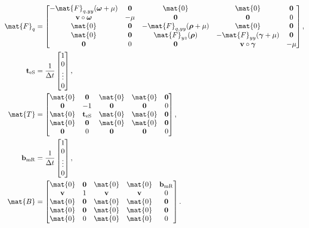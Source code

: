 \documentclass{jpmarticle}
\renewcommand{\vec}[1]{\boldsymbol{\mathrm{#1}}}
\let\subequationsorig\subequations%
\let\endsubequationsorig\endsubequations%
\renewenvironment{subequations}{
  \subequationsorig
  \renewcommand{\theequation}{\theparentequation.\arabic{equation}}
}{
  \endsubequationsorig
}
\begin{document}
\begin{subequations}
\begin{align}
    \mat{F}_q &=
    \begin{bmatrix}
      - \mat{F}_{q, yy}(\vec{\omega} + \mu) & \vec{0} & \mat{0} & \mat{0}
      & \vec{0}
      \\
      \vec{v} \circ \vec{\omega} & - \mu & \vec{0} & \vec{0} & 0
      \\
      \mat{0} & \vec{0} & - \mat{F}_{q, yy}(\vec{\rho} + \mu) & \mat{0}
      & \vec{0}
      \\
      \mat{0} & \vec{0} & \mat{F}_{yz}(\vec{\rho})
      & - \mat{F}_{yy}(\vec{\gamma} + \mu) & \vec{0}
      \\
      \vec{0} & 0 & \vec{0} & \vec{v} \circ \vec{\gamma} & - \mu
    \end{bmatrix},
    \\
    \vec{t}_{\mathrm{eS}} &=
    \frac{1}{\Delta t}
    \begin{bmatrix}
      1 \\ 0 \\ \vdots \\ 0
    \end{bmatrix},
    \\
    \mat{T} &=
    \begin{bmatrix}
      \mat{0} & \vec{0} & \mat{0} & \mat{0} & \vec{0}
      \\
      \vec{0} & - 1 & \vec{0} & \vec{0} & 0
      \\
      \mat{0} & \vec{t}_{\mathrm{eS}} & \mat{0} & \mat{0} & \vec{0}
      \\
      \mat{0} & \vec{0} & \mat{0} & \mat{0} & \vec{0}
      \\
      \vec{0} & 0 & \vec{0} & \vec{0} & 0
    \end{bmatrix},
    \\
    \vec{b}_{\mathrm{mR}} &=
    \frac{1}{\Delta t}
    \begin{bmatrix}
      1 \\ 0 \\ \vdots \\ 0
    \end{bmatrix},
    \\
    \mat{B} &=
    \begin{bmatrix}
      \mat{0} & \vec{0} & \mat{0} & \mat{0} & \vec{b}_{\mathrm{mR}}
      \\
      \vec{v} & 1 & \vec{v} & \vec{v} & 0
      \\
      \mat{0} & \vec{0} & \mat{0} & \mat{0} & \vec{0}
      \\
      \mat{0} & \vec{0} & \mat{0} & \mat{0} & \vec{0}
      \\
      \mat{0} & 0 & \mat{0} & \mat{0} & 0
    \end{bmatrix}.
  \end{align}
\end{subequations}
\end{document}
